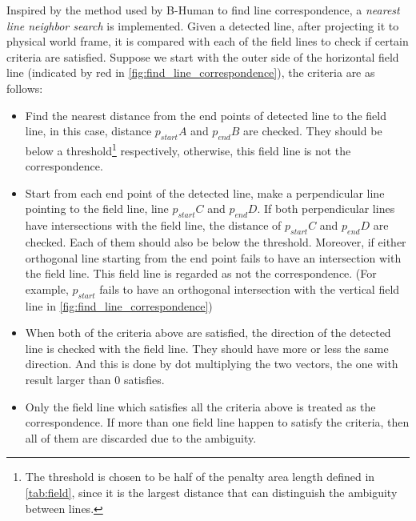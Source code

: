 Inspired by the method used by B-Human \cite{Bhuman} to find line correspondence, a \textit{nearest line neighbor search} is implemented. Given a detected line, after projecting it to physical world frame, it is compared with each of the field lines to check if certain criteria are satisfied. Suppose we start with the outer side of the horizontal field line (indicated by red in
\autoref{fig:find_line_correspondence}), the criteria are as follows:
\begin{itemize}
  \item Find the nearest distance from the end points of detected line to the field line, in this case, distance $p_{start}A$ and $p_{end}B$ are checked. They should be below a threshold\footnote{The threshold is chosen to be half of the penalty area length defined in \autoref{tab:field}, since it is the largest distance that can distinguish the ambiguity between lines.} respectively, otherwise, this field line is not the correspondence.
  \item Start from each end point of the detected line, make a perpendicular line pointing to the field line, \ie{} line $p_{start}C$ and $p_{end}D$. If both perpendicular lines have intersections with the field line, the distance of $p_{start}C$ and $p_{end}D$ are checked. Each of them should also be below the threshold. Moreover, if either orthogonal line starting from the end point fails to have an intersection with the field line. This field line is regarded as not the correspondence. (For example, $p_{start}$ fails to have an orthogonal intersection with the vertical field line in \autoref{fig:find_line_correspondence}) 
   \item When both of the criteria above are satisfied, the direction of the detected line is checked with the field line. They should have more or less the same direction. And this is done by dot multiplying the two vectors, the one with result larger than 0 satisfies.
   \item Only the field line which satisfies all the criteria above is treated as the correspondence. If more than one field line happen to satisfy the criteria, then all of them are discarded due to the ambiguity.
\end{itemize}

